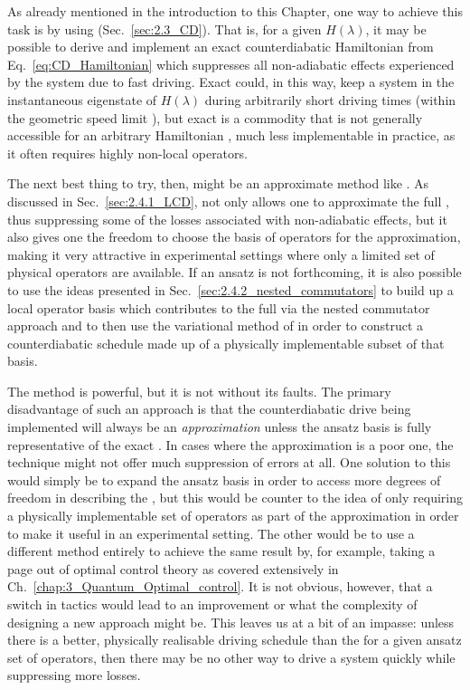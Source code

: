 As already mentioned in the introduction to this Chapter, one way to achieve this task is by using  (Sec.~\ref{sec:2.3_CD}). That is, for a given $H(\lambda)$, it may be possible to derive and implement an exact counterdiabatic Hamiltonian from Eq.~\ref{eq:CD_Hamiltonian} which suppresses all non-adiabatic effects experienced by the system due to fast driving. Exact  could, in this way, keep a system in the instantaneous eigenstate of $H(\lambda)$ during arbitrarily short driving times (within the geometric speed limit \cite{bukov_geometric_2019}), but exact  is a commodity that is not generally accessible for an arbitrary Hamiltonian \cite{kolodrubetz_geometry_2017}, much less implementable in practice, as it often requires highly non-local operators. 

The next best thing to try, then, might be an approximate  method like . As discussed in Sec.~\ref{sec:2.4.1_LCD},  not only allows one to approximate the full , thus suppressing some of the losses associated with non-adiabatic effects, but it also gives one the freedom to choose the basis of operators for the approximation, making it very attractive in experimental settings where only a limited set of physical operators are available. If an ansatz is not forthcoming, it is also possible to use the ideas presented in Sec.~\ref{sec:2.4.2_nested_commutators} to build up a local operator basis which contributes to the full  via the nested commutator approach \cite{geier_floquet_2021} and to then use the variational method of  in order to construct a counterdiabatic schedule made up of a physically implementable subset of that basis. 

The  method is powerful, but it is not without its faults. The primary disadvantage of such an approach is that the counterdiabatic drive being implemented will always be an \emph{approximation} unless the ansatz basis is fully representative of the exact . In cases where the approximation is a poor one, the  technique might not offer much suppression of errors at all. One solution to this would simply be to expand the ansatz basis in order to access more degrees of freedom in describing the , but this would be counter to the idea of only requiring a physically implementable set of operators as part of the approximation in order to make it useful in an experimental setting. The other would be to use a different method entirely to achieve the same result by, for example, taking a page out of optimal control theory as covered extensively in Ch.~\ref{chap:3_Quantum_Optimal_control}. It is not obvious, however, that a switch in tactics would lead to an improvement or what the complexity of designing a new approach might be. This leaves us at a bit of an impasse: unless there is a better, physically realisable driving schedule than the  for a given ansatz set of operators, then there may be no other way to drive a system quickly while suppressing more losses.

